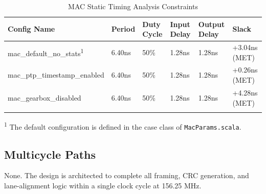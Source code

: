 \renewcommand*{\arraystretch}{1.4}
\begin{longtable}[H]{
    | p{}
    | p{}
    | p{}
    | p{}
    | p{}
    | p{} |
  }
  \hline
  \textbf{Config Name}  &
  \textbf{Period}       &
  \textbf{Duty Cycle}   &
  \textbf{Input Delay}  &
  \textbf{Output Delay} &
  \textbf{Slack}          \\ \hline \hline

  mac\_default\_no\_stats\textsuperscript{1} & 
  6.40ns & 
  50\% & 
  1.28ns & 
  1.28ns & 
  +3.04ns (MET) \\ \hline

  mac\_ptp\_timestamp\_enabled & 
  6.40ns & 
  50\% & 
  1.28ns & 
  1.28ns & 
  +0.26ns (MET) \\ \hline

  mac\_gearbox\_disabled & 
  6.40ns & 
  50\% & 
  1.28ns & 
  1.28ns & 
  +4.28ns (MET) \\ \hline
  \caption{MAC Static Timing Analysis Constraints}\label{table:timing}
\end{longtable}

\small{\textsuperscript{1} The default configuration is defined in the case class of \texttt{MacParams.scala}.}

\subsection{Multicycle Paths}
None. The design is architected to complete all framing, CRC generation, and lane-alignment logic within a single clock cycle at 156.25 MHz.